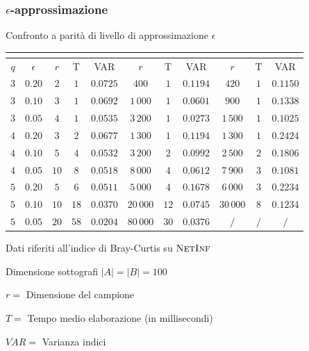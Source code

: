 \begin{frame}
	\frametitle{$\epsilon$-approssimazione}
	\centering
	
	Confronto a parità di livello di approssimazione $\epsilon$
	\begin{table}[ht]
		\begin{tabular}{|c|c|c|c|c|c|c|c|c|c|c|}
			\cline{3-11}
			\multicolumn{2}{c|}{} & \multicolumn{3}{c|}{\fcount} & \multicolumn{3}{c|}{\fsamp} & \multicolumn{3}{c|}{\base}\\
			\hline	
			$q$ & $\epsilon$ & $r$ & T    & VAR      & $r$ & T    & VAR      & $r$ & T   & VAR      \\ \hline
			$3$ & $0.20$     & \color{green}$2$  & $1$  & $0.0725$ & \color{orange}$400$     & $1$  & $0.1194$ & \color{   red}$420$     & $1$ & $0.1150$ \\ \hline
			$3$ & $0.10$     & \color{green}$3$  & $1$  & $0.0692$ & \color{   red}$1\,000$  & $1$  & $0.0601$ & \color{orange}$900$     & $1$ & $0.1338$ \\ \hline
			$3$ & $0.05$     & \color{green}$4$  & $1$  & $0.0535$ & \color{   red}$3\,200$  & $1$  & $0.0273$ & \color{orange}$1\,500$  & $1$ & $0.1025$ \\ \hline
			\hline
			$4$ & $0.20$     & \color{green}$3$  & $2$  & $0.0677$ & \color{   red}$1\,300$  & $1$  & $0.1194$ & \color{orange}$1\,300$  & $1$ & $0.2424$ \\ \hline
			$4$ & $0.10$     & \color{green}$5$  & $4$  & $0.0532$ & \color{   red}$3\,200$  & $2$  & $0.0992$ & \color{orange}$2\,500$  & $2$ & $0.1806$ \\ \hline
			$4$ & $0.05$     & \color{green}$10$ & $8$  & $0.0518$ & \color{   red}$8\,000$  & $4$  & $0.0612$ & \color{orange}$7\,900$  & $3$ & $0.1081$ \\ \hline
			\hline
			$5$ & $0.20$     & \color{green}$5$  & $6$  & $0.0511$ & \color{orange}$5\,000$  & $4$  & $0.1678$ & \color{   red}$6\,000$  & $3$ & $0.2234$ \\ \hline
			$5$ & $0.10$     & \color{green}$10$ & $18$ & $0.0370$ & \color{orange}$20\,000$ & $12$ & $0.0745$ & \color{   red}$30\,000$ & $8$ & $0.1234$ \\ \hline
			$5$ & $0.05$     & \color{green}$20$ & $58$ & $0.0204$ & \color{orange}$80\,000$ & $30$ & $0.0376$ & \color{   red}$/$       & $/$ & $/$      \\ \hline
		\end{tabular}
		
		\medskip
			Dati riferiti all'indice di Bray-Curtis su $\textsc{NetInf}$
		\small
		\begin{flushleft}
		
		
			Dimensione sottografi $|A| = |B| = 100$
		
			$r =$ Dimensione del campione
		
			$T = $ Tempo medio elaborazione (in millisecondi)
		
			$VAR = $ Varianza indici
		
		
		\end{flushleft}

	\end{table}
\end{frame}




